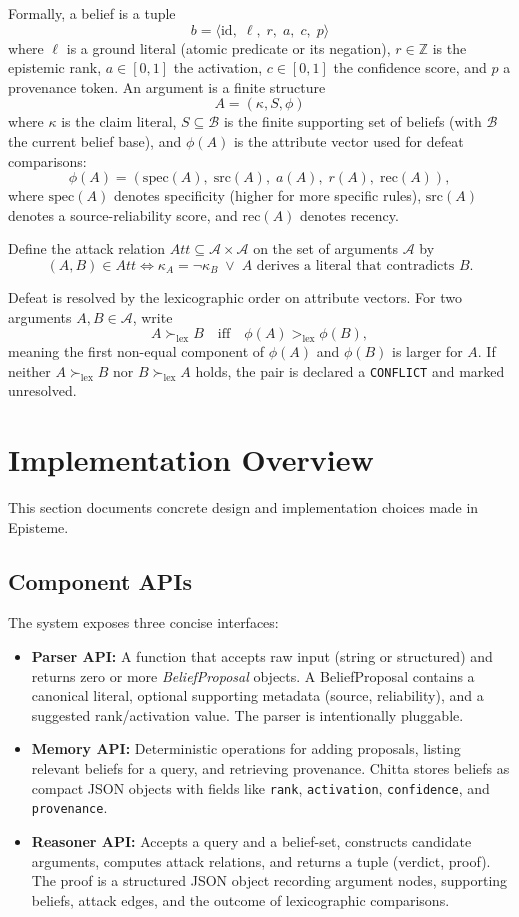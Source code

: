 \documentclass[11pt]{article}
\begin{document}
Formally, a belief is a tuple
\[ b = \langle\mathrm{id},\;\ell,\;r,\;a,\;c,\;p\rangle \]
where $\ell$ is a ground literal (atomic predicate or its negation), $r\in\mathbb{Z}$ is
the epistemic rank, $a\in[0,1]$ the activation, $c\in[0,1]$ the confidence score, and
$p$ a provenance token. An argument is a finite structure
\[ A = (\kappa, S, \phi)\]
where $\kappa$ is the claim literal, $S\subseteq\mathcal{B}$ is the finite supporting set
of beliefs (with $\mathcal{B}$ the current belief base), and $\phi(A)$ is the attribute
vector used for defeat comparisons:
\[\phi(A) = (\mathrm{spec}(A),\;\mathrm{src}(A),\;a(A),\;r(A),\;\mathrm{rec}(A)),\]
where $\mathrm{spec}(A)$ denotes specificity (higher for more specific rules),
$\mathrm{src}(A)$ denotes a source-reliability score, and $\mathrm{rec}(A)$ denotes recency.

Define the attack relation $\mathit{Att}\subseteq\mathcal{A}\times\mathcal{A}$ on the
set of arguments $\mathcal{A}$ by
\[ (A,B)\in\mathit{Att} \iff \kappa_A = \neg\kappa_B \;\vee\; A\text{ derives a literal that contradicts }B.\]

Defeat is resolved by the lexicographic order on attribute vectors. For two arguments
$A,B\in\mathcal{A}$, write
\[ A \succ_{\mathrm{lex}} B \quad\text{iff}\quad \phi(A) >_{\mathrm{lex}} \phi(B),\]
meaning the first non-equal component of $\phi(A)$ and $\phi(B)$ is larger for $A$.
If neither $A\succ_{\mathrm{lex}} B$ nor $B\succ_{\mathrm{lex}} A$ holds, the pair is
declared a \texttt{CONFLICT} and marked unresolved.

\section{Implementation Overview}
This section documents concrete design and implementation choices made in Episteme.

\subsection{Component APIs}
The system exposes three concise interfaces:
\begin{itemize}
  \item \textbf{Parser API:} A function that accepts raw input (string or structured)
    and returns zero or more \emph{BeliefProposal} objects. A BeliefProposal contains
    a canonical literal, optional supporting metadata (source, reliability), and a
    suggested rank/activation value. The parser is intentionally pluggable.
  \item \textbf{Memory API:} Deterministic operations for adding proposals, listing
    relevant beliefs for a query, and retrieving provenance. Chitta stores beliefs
    as compact JSON objects with fields like \texttt{rank}, \texttt{activation},
    \texttt{confidence}, and \texttt{provenance}.
  \item \textbf{Reasoner API:} Accepts a query and a belief-set, constructs candidate
    arguments, computes attack relations, and returns a tuple (verdict, proof).
    The proof is a structured JSON object recording argument nodes, supporting
    beliefs, attack edges, and the outcome of lexicographic comparisons.
\end{itemize}
\end{document}
